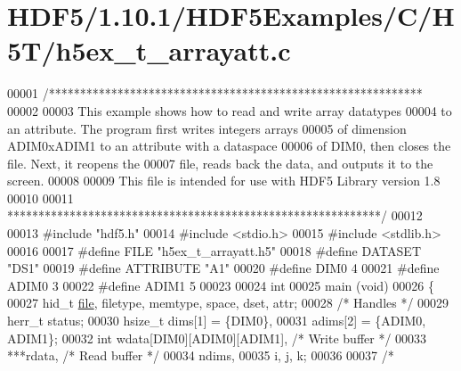 \hypertarget{_h_d_f5_21_810_81_2_h_d_f5_examples_2_c_2_h5_t_2h5ex__t__arrayatt_8c_source}{}\section{H\+D\+F5/1.10.1/\+H\+D\+F5\+Examples/\+C/\+H5\+T/h5ex\+\_\+t\+\_\+arrayatt.c}
\label{_h_d_f5_21_810_81_2_h_d_f5_examples_2_c_2_h5_t_2h5ex__t__arrayatt_8c_source}

\begin{DoxyCode}
00001 \textcolor{comment}{/************************************************************}
00002 \textcolor{comment}{}
00003 \textcolor{comment}{  This example shows how to read and write array datatypes}
00004 \textcolor{comment}{  to an attribute.  The program first writes integers arrays}
00005 \textcolor{comment}{  of dimension ADIM0xADIM1 to an attribute with a dataspace}
00006 \textcolor{comment}{  of DIM0, then closes the  file.  Next, it reopens the}
00007 \textcolor{comment}{  file, reads back the data, and outputs it to the screen.}
00008 \textcolor{comment}{}
00009 \textcolor{comment}{  This file is intended for use with HDF5 Library version 1.8}
00010 \textcolor{comment}{}
00011 \textcolor{comment}{ ************************************************************/}
00012 
00013 \textcolor{preprocessor}{#include "hdf5.h"}
00014 \textcolor{preprocessor}{#include <stdio.h>}
00015 \textcolor{preprocessor}{#include <stdlib.h>}
00016 
00017 \textcolor{preprocessor}{#define FILE            "h5ex\_t\_arrayatt.h5"}
00018 \textcolor{preprocessor}{#define DATASET         "DS1"}
00019 \textcolor{preprocessor}{#define ATTRIBUTE       "A1"}
00020 \textcolor{preprocessor}{#define DIM0            4}
00021 \textcolor{preprocessor}{#define ADIM0           3}
00022 \textcolor{preprocessor}{#define ADIM1           5}
00023 
00024 \textcolor{keywordtype}{int}
00025 main (\textcolor{keywordtype}{void})
00026 \{
00027     hid\_t       \hyperlink{structfile}{file}, filetype, memtype, space, dset, attr;
00028                                                 \textcolor{comment}{/* Handles */}
00029     herr\_t      status;
00030     hsize\_t     dims[1] = \{DIM0\},
00031                 adims[2] = \{ADIM0, ADIM1\};
00032     \textcolor{keywordtype}{int}         wdata[DIM0][ADIM0][ADIM1],      \textcolor{comment}{/* Write buffer */}
00033                 ***rdata,                       \textcolor{comment}{/* Read buffer */}
00034                 ndims,
00035                 i, j, k;
00036 
00037     \textcolor{comment}{/*}

\end{DoxyCode}
